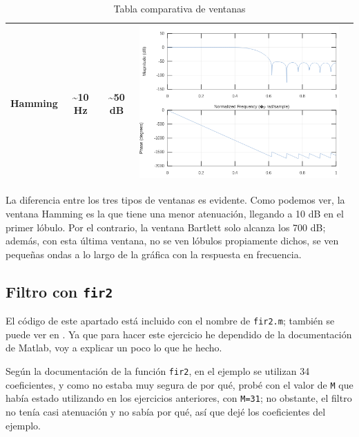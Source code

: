 \documentclass[11pt,a4paper]{article}
\begin{document}
\begin{table}[H]
\begin{tabular}{|c|c|c|c|c|}
Hamming & \textasciitilde{}10 Hz            & \textasciitilde{}50 dB                       & \includegraphics[scale=0.25]{img/8.png} & \color{deepred}\nameref{code7}\color{black} \\ \hline
\end{tabular}
\caption{Tabla comparativa de ventanas}
\end{table}

La diferencia entre los tres tipos de ventanas es evidente. Como podemos ver, la ventana Hamming es la que tiene una menor atenuación, llegando a 10 dB en el primer lóbulo. Por el contrario, la ventana Bartlett solo alcanza los 700 dB; además, con esta última ventana, no se ven lóbulos propiamente dichos, se ven pequeñas ondas a lo largo de la gráfica con la respuesta en frecuencia.

\newpage

\subsection{Filtro con \texttt{fir2}}

El código de este apartado está incluido con el nombre de \texttt{fir2.m}; también se puede ver en \color{deepred}\color{black}. Ya que para hacer este ejercicio he dependido de la documentación de Matlab, voy a explicar un poco lo que he hecho.

Según la documentación de la función \texttt{fir2}, en el ejemplo se utilizan 34 coeficientes, y como no estaba muy segura de por qué, probé con el valor de \texttt{M} que había estado utilizando en los ejercicios anteriores, con \texttt{M=31}; no obstante, el filtro no tenía casi atenuación y no sabía por qué, así que dejé los coeficientes del ejemplo.\\
\end{document}
